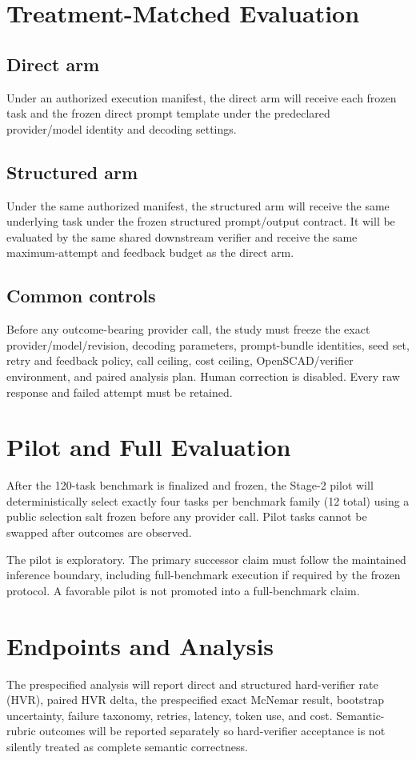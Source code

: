\documentclass[conference]{IEEEtran}
\begin{document}
\section{Treatment-Matched Evaluation}
\subsection{Direct arm}
Under an authorized execution manifest, the direct arm will receive each frozen task and the frozen direct prompt template under the predeclared provider/model identity and decoding settings.

\subsection{Structured arm}
Under the same authorized manifest, the structured arm will receive the same underlying task under the frozen structured prompt/output contract. It will be evaluated by the same shared downstream verifier and receive the same maximum-attempt and feedback budget as the direct arm.

\subsection{Common controls}
Before any outcome-bearing provider call, the study must freeze the exact provider/model/revision, decoding parameters, prompt-bundle identities, seed set, retry and feedback policy, call ceiling, cost ceiling, OpenSCAD/verifier environment, and paired analysis plan. Human correction is disabled. Every raw response and failed attempt must be retained.

\section{Pilot and Full Evaluation}
After the 120-task benchmark is finalized and frozen, the Stage-2 pilot will deterministically select exactly four tasks per benchmark family (12 total) using a public selection salt frozen before any provider call. Pilot tasks cannot be swapped after outcomes are observed.

The pilot is exploratory. The primary successor claim must follow the maintained inference boundary, including full-benchmark execution if required by the frozen protocol. A favorable pilot is not promoted into a full-benchmark claim.

\section{Endpoints and Analysis}
The prespecified analysis will report direct and structured hard-verifier rate (HVR), paired HVR delta, the prespecified exact McNemar result, bootstrap uncertainty, failure taxonomy, retries, latency, token use, and cost. Semantic-rubric outcomes will be reported separately so hard-verifier acceptance is not silently treated as complete semantic correctness.
\end{document}
